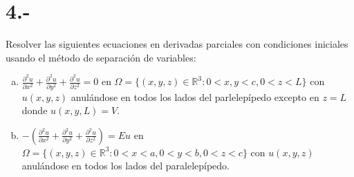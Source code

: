 \documentclass{article}
\begin{document}
\section*{4.-}
Resolver las siguientes ecuaciones en derivadas parciales con 
condiciones iniciales usando el método de separación de variables:
\begin{enumerate}[a)]
    \item $\frac{\partial^2u}{\partial x^2}+\frac{\partial^2u}{\partial y^2}+\frac{\partial^2u}{\partial z^2}=0$ en $\Omega=\{(x,y,z)\in \mathbb{R}^3: 0<x,y<c, 0<z<L\}$ con $u(x,y,z)$ anulándose en todos los lados del parlelepípedo excepto en $z=L$ donde $u(x,y,L)=V$.
    \item $-\left(\frac{\partial^2u}{\partial x^2}+\frac{\partial^2u}{\partial y^2}+\frac{\partial^2u}{\partial z^2}\right)=Eu$ en $\Omega=\{(x,y,z)\in\mathbb{R}^3: 0<x<a,0<y<b, 0<z<c\}$
    con $u(x,y,z)$ anulándose en todos los lados del paralelepípedo. 
\end{enumerate}
\end{document}
